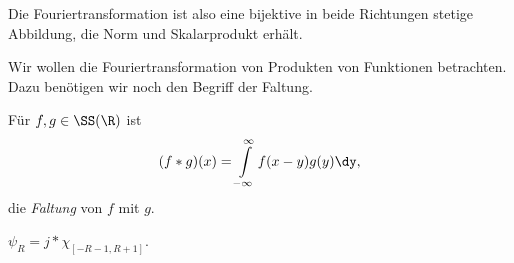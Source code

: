 \addtocounter{prop}{1}
Die Fouriertransformation ist also eine bijektive in beide Richtungen stetige
Abbildung, die Norm und Skalarprodukt erhält.

Wir wollen die Fouriertransformation von Produkten von Funktionen betrachten.
Dazu benötigen wir noch den Begriff der Faltung.
\begin{defn}
\label{defn:2.17}
Für $f,g\in\SS(\R)$ ist
\begin{align*}
(f*g)(x) = \int\limits_{-\infty}^\infty f(x-y)g(y)\dy,
\end{align*}
die \emph{Faltung} von $f$ mit $g$.\fishhere
\end{defn}

\begin{bspn}
$\psi_R  = j*\chi_{[-R-1,R+1]}$.\bsphere
\end{bspn}

